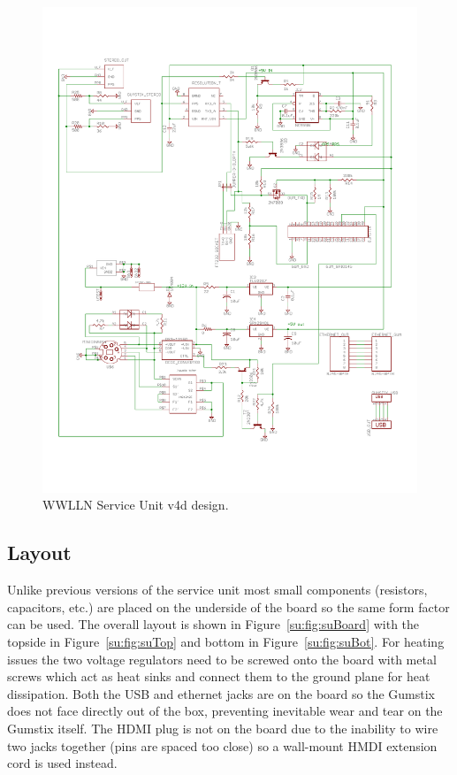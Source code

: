 \begin{figure}[ht!]
   \centering
   \includegraphics[scale=.75]{Appendix/Figures/wwlln_SU_v4_Schematic.pdf} 
   \caption{WWLLN Service Unit v4d design.}
   \label{su:fig:suSchematic}
\end{figure}

\subsection{Layout}

Unlike previous versions of the service unit most small components (resistors, capacitors, etc.) are placed on the underside of the board so the same form factor can be used.
The overall layout is shown in Figure~\ref{su:fig:suBoard} with the topside in Figure~\ref{su:fig:suTop} and bottom in Figure~\ref{su:fig:suBot}.
For heating issues the two voltage regulators need to be screwed onto the board with metal screws which act as heat sinks and connect them to the ground plane for heat dissipation.
Both the USB and ethernet jacks are on the board so the Gumstix does not face directly out of the box, preventing inevitable wear and tear on the Gumstix itself.
The HDMI plug is not on the board due to the inability to wire two jacks together (pins are spaced too close) so a wall-mount HMDI extension cord is used instead.

